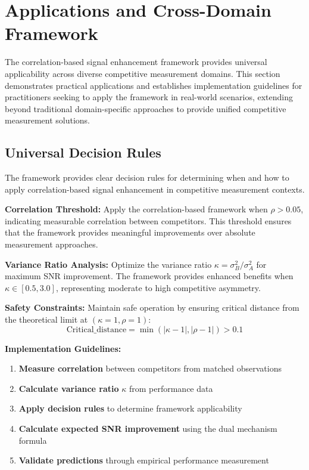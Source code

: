 \section{Applications and Cross-Domain Framework}

The correlation-based signal enhancement framework provides universal applicability across diverse competitive measurement domains. This section demonstrates practical applications and establishes implementation guidelines for practitioners seeking to apply the framework in real-world scenarios, extending beyond traditional domain-specific approaches \cite{stefani2011measurement} to provide unified competitive measurement solutions.

\subsection{Universal Decision Rules}

The framework provides clear decision rules for determining when and how to apply correlation-based signal enhancement in competitive measurement contexts.

\textbf{Correlation Threshold:}
Apply the correlation-based framework when $\rho > 0.05$, indicating measurable correlation between competitors. This threshold ensures that the framework provides meaningful improvements over absolute measurement approaches.

\textbf{Variance Ratio Analysis:}
Optimize the variance ratio $\kappa = \sigma_B^2/\sigma_A^2$ for maximum SNR improvement. The framework provides enhanced benefits when $\kappa \in [0.5, 3.0]$, representing moderate to high competitive asymmetry.

\textbf{Safety Constraints:}
Maintain safe operation by ensuring critical distance from the theoretical limit at $(\kappa=1, \rho=1)$:
\begin{equation}
\text{Critical\_distance} = \min(|\kappa - 1|, |\rho - 1|) > 0.1
\end{equation}

\textbf{Implementation Guidelines:}
\begin{enumerate}
    \item \textbf{Measure correlation} between competitors from matched observations
    \item \textbf{Calculate variance ratio} $\kappa$ from performance data
    \item \textbf{Apply decision rules} to determine framework applicability
    \item \textbf{Calculate expected SNR improvement} using the dual mechanism formula
    \item \textbf{Validate predictions} through empirical performance measurement
\end{enumerate}


